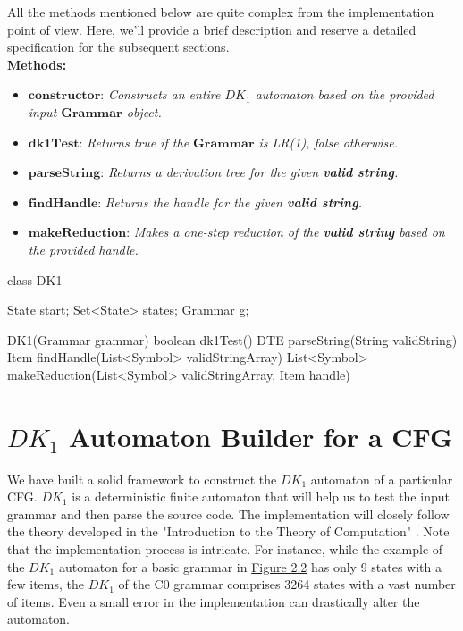 All the methods mentioned below are quite complex from the implementation point of view. Here, we'll provide a brief description and reserve a detailed specification for the subsequent sections.\\

\textbf{Methods:}
\begin{itemize}
    \item \(\boldsymbol{constructor}\): \textit{Constructs an entire \(DK_{1}\) automaton based on the provided input \(\boldsymbol{Grammar}\) object.}
    \item \(\boldsymbol{dk1Test}\): \textit{Returns true if the \(\boldsymbol{Grammar}\) is LR(1), false otherwise.}
    \item \(\boldsymbol{parseString}\): \textit{Returns a derivation tree for the given \textbf{valid string}.}
    \item \(\boldsymbol{findHandle}\): \textit{Returns the handle for the given \textbf{valid string}.}
    \item \(\boldsymbol{makeReduction}\): \textit{Makes a one-step reduction of the \textbf{valid string} based on the provided handle.}
\end{itemize}

\begin{codeblock}
    class DK1 {
        State start;
        Set<State> states;
        Grammar g;

        DK1(Grammar grammar) {}
        boolean dk1Test() {}
        DTE parseString(String validString) {}
        Item findHandle(List<Symbol> validStringArray) {}
        List<Symbol> makeReduction(List<Symbol> validStringArray, Item handle) {}
    }
\end{codeblock}

\newpage


\section{\(DK_{1}\) Automaton Builder for a CFG}\label{sec:DK1 Automaton Builder for a CFG}

We have built a solid framework to construct the \(DK_{1}\) automaton of a particular CFG. \(DK_{1}\) is a deterministic finite automaton that will help us to test the input grammar and then parse the source code. The implementation will closely follow the theory developed in the "Introduction to the Theory of Computation" \cite{sipser}. Note that the implementation process is intricate. For instance, while the example of the \(DK_{1}\) automaton for a basic grammar in \hyperref[figure 3]{Figure 2.2} has only 9 states with a few items, the \(DK_{1}\) of the C0 grammar comprises 3264 states with a vast number of items. Even a small error in the implementation can drastically alter the automaton.

